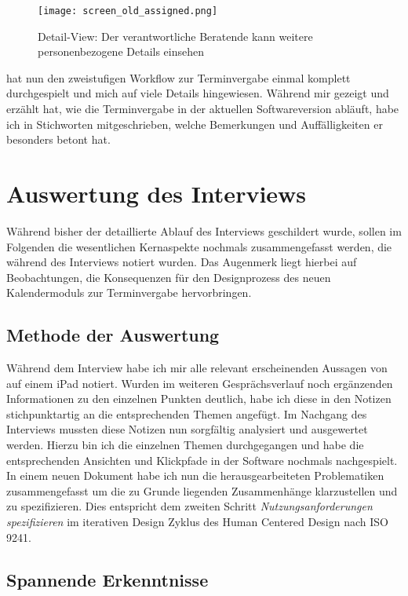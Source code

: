 \begin{figure}[H]
    \caption{Detail-View: Der verantwortliche Beratende kann weitere personenbezogene Details einsehen}
    \centering
    \texttt{[image: screen\_old\_assigned.png]}
\end{figure}

\ipName hat nun den zweistufigen Workflow zur Terminvergabe einmal komplett
durchgespielt und mich auf viele Details hingewiesen. Während \ipName mir
gezeigt und erzählt hat, wie die Terminvergabe in der aktuellen Softwareversion
abläuft, habe ich in Stichworten mitgeschrieben, welche Bemerkungen und
Auffälligkeiten er besonders betont hat.

\section{Auswertung des Interviews}

Während bisher der detaillierte Ablauf des Interviews geschildert wurde, sollen
im Folgenden die wesentlichen Kernaspekte nochmals zusammengefasst werden, die
während des Interviews notiert wurden. Das Augenmerk liegt hierbei auf
Beobachtungen, die Konsequenzen für den Designprozess des neuen Kalendermoduls
zur Terminvergabe hervorbringen.

\subsection*{Methode der Auswertung}
Während dem Interview habe ich mir alle relevant erscheinenden Aussagen von
\ipName auf einem iPad notiert. Wurden im weiteren Gesprächsverlauf noch
ergänzenden Informationen zu den einzelnen Punkten deutlich, habe ich diese in
den Notizen stichpunktartig an die entsprechenden Themen angefügt. Im Nachgang
des Interviews mussten diese Notizen nun sorgfältig analysiert und ausgewertet
werden. Hierzu bin ich die einzelnen Themen durchgegangen und habe die
entsprechenden Ansichten und Klickpfade in der Software nochmals nachgespielt.
In einem neuen Dokument habe ich nun die herausgearbeiteten Problematiken
zusammengefasst um die zu Grunde liegenden Zusammenhänge klarzustellen und zu
spezifizieren. Dies entspricht dem zweiten Schritt
\textit{Nutzungsanforderungen spezifizieren} im iterativen Design Zyklus des
Human Centered Design nach ISO 9241\cite{ISO9241}.

\subsection*{Spannende Erkenntnisse}
\label{subsection:SpannendeErkenntnisse}

